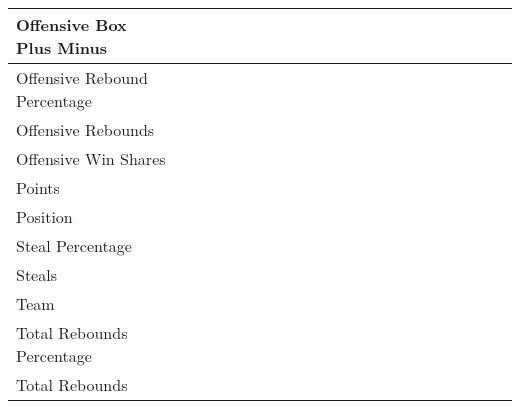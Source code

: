 \documentclass{article}
\def \cm{\checkmark}
\begin{document}
\begin{table}[ht]
\begin{tabular}{lccccccccccccccccccccc}
            \midrule
            Offensive Box Plus Minus            &     &     &     &     &     &     &     &     &     &     &     &     & \cm & \cm & \cm & \cm & \cm & \cm & \cm & \cm & \cm \\
            \midrule
            Offensive Rebound Percentage        &     &     &     &     &     &     &     &     &     &     &     &     &     & \cm & \cm & \cm & \cm & \cm & \cm & \cm & \cm \\
            \midrule
            Offensive Rebounds                  &     &     &     &     &     &     &     &     &     &     &     &     & \cm & \cm & \cm & \cm & \cm & \cm & \cm & \cm & \cm \\
            \midrule
            Offensive Win Shares                &     &     & \cm & \cm & \cm & \cm & \cm & \cm & \cm & \cm & \cm & \cm & \cm & \cm & \cm & \cm & \cm & \cm & \cm & \cm & \cm \\
            \midrule
            Points                              & \cm & \cm & \cm & \cm & \cm & \cm & \cm & \cm & \cm & \cm & \cm & \cm & \cm & \cm & \cm & \cm & \cm & \cm & \cm & \cm & \cm \\
            \midrule
            Position                            & \cm & \cm & \cm & \cm & \cm & \cm & \cm & \cm & \cm & \cm & \cm & \cm & \cm & \cm & \cm & \cm & \cm & \cm & \cm & \cm & \cm \\
            \midrule
            Steal Percentage                    &     &     &     &     &     &     &     &     &     &     &     &     &     & \cm & \cm & \cm & \cm & \cm & \cm & \cm & \cm \\
            \midrule
            Steals                              &     &     &     &     &     &     &     &     &     &     &     &     & \cm & \cm & \cm & \cm & \cm & \cm & \cm & \cm & \cm \\
            \midrule
            Team                                & \cm & \cm & \cm & \cm & \cm & \cm & \cm & \cm & \cm & \cm & \cm & \cm & \cm & \cm & \cm & \cm & \cm & \cm & \cm & \cm & \cm \\
            \midrule
            Total Rebounds Percentage           &     &     &     &     &     &     &     &     &     &     &     & \cm & \cm & \cm & \cm & \cm & \cm & \cm & \cm & \cm & \cm \\
            \midrule
            Total Rebounds                      &     &     &     &     &     &     & \cm & \cm & \cm & \cm & \cm & \cm & \cm & \cm & \cm & \cm & \cm & \cm & \cm & \cm & \cm \\

\end{tabular}
\end{table}
\end{document}
